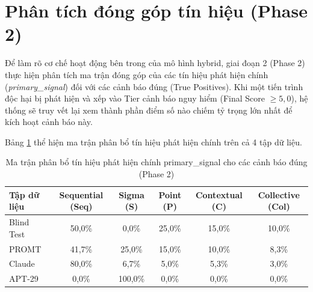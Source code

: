 \documentclass[../main.tex]{subfiles}
\begin{document}
\section{Phân tích đóng góp tín hiệu (Phase 2)}
\label{section:3.3}

Để làm rõ cơ chế hoạt động bên trong của mô hình hybrid, giai đoạn 2 (Phase 2) thực hiện phân tích ma trận đóng góp của các tín hiệu phát hiện chính (\textit{primary\_signal}) đối với các cảnh báo đúng (True Positives). Khi một tiến trình độc hại bị phát hiện và xếp vào Tier cảnh báo nguy hiểm (Final Score $\ge 5,0$), hệ thống sẽ truy vết lại xem thành phần điểm số nào chiếm tỷ trọng lớn nhất để kích hoạt cảnh báo này.

Bảng \ref{table:signal_contribution} thể hiện ma trận phân bổ tín hiệu phát hiện chính trên cả 4 tập dữ liệu.

\begin{table}[H]
\centering
\begin{tabular}{|l|c|c|c|c|c|}
\hline
\textbf{Tập dữ liệu} & \textbf{Sequential (Seq)} & \textbf{Sigma (S)} & \textbf{Point (P)} & \textbf{Contextual (C)} & \textbf{Collective (Col)} \\ \hline
Blind Test & 50,0\% & 0,0\% & 25,0\% & 15,0\% & 10,0\% \\ \hline
PROMT & 41,7\% & 25,0\% & 15,0\% & 10,0\% & 8,3\% \\ \hline
Claude & 80,0\% & 6,7\% & 5,0\% & 5,3\% & 3,0\% \\ \hline
APT-29 & 0,0\% & 100,0\% & 0,0\% & 0,0\% & 0,0\% \\ \hline
\end{tabular}
\caption{Ma trận phân bổ tín hiệu phát hiện chính primary\_signal cho các cảnh báo đúng (Phase 2)}
\label{table:signal_contribution}
\end{table}
\end{document}
